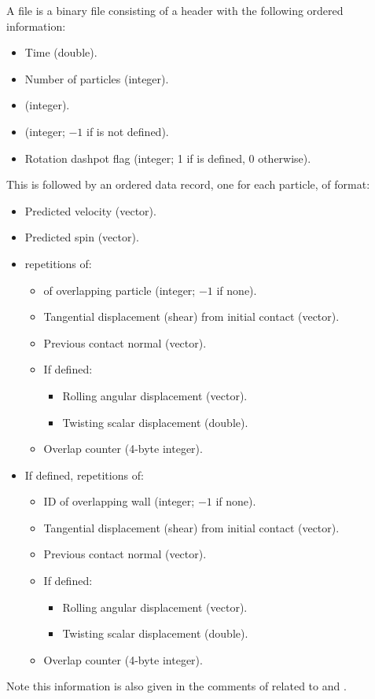 A  file is a binary file consisting of a header with the
following ordered information:
\begin{itemize}
\item Time (double).
\item Number of particles (integer).
\item {} (integer).
\item {} (integer;
  $-1$ if  is not defined).
\item Rotation dashpot flag (integer; 1 if
   is defined, 0 otherwise).
\end{itemize}
This is followed by an ordered data record, one for each
particle, of format:
\begin{itemize}
\item Predicted velocity (vector).
\item Predicted spin (vector).
\item {} repetitions of:
  \begin{itemize}
  \item {} of overlapping particle (integer; $-1$ if none).
  \item Tangential displacement (shear) from initial contact (vector).
  \item Previous contact normal (vector).
  \item If  defined:
    \begin{itemize}
    \item Rolling angular displacement (vector).
    \item Twisting scalar displacement (double).
    \end{itemize}
  \item Overlap counter (4-byte integer).
  \end{itemize}
\item If  defined,
   repetitions of:
  \begin{itemize}
  \item ID of overlapping wall (integer; $-1$ if none).
  \item Tangential displacement (shear) from initial contact (vector).
  \item Previous contact normal (vector).
  \item If  defined:
    \begin{itemize}
    \item Rolling angular displacement (vector).
    \item Twisting scalar displacement (double).
    \end{itemize}
  \item Overlap counter (4-byte integer).    
  \end{itemize}
\end{itemize}
Note this information is also given in the comments of
 related to  and
.

